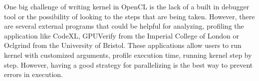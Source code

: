 One big challenge of writing kernel in OpenCL is the lack of a built in debugger tool or the possibility of  looking to the steps that are being taken. However, there are several external programs that could be helpful for analyzing, profiling the application like CodeXL, GPUVerify from the Imperial College of London or Oclgrind from the University of Bristol. These applications allow users to run kernel with customized arguments, profile execution time, running kernel step by step. However, having a good strategy for parallelizing is the best way to prevent errors in execution.
